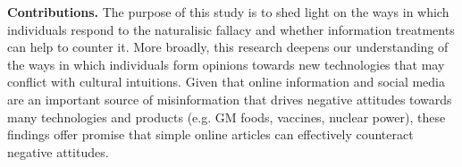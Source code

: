 \documentclass[12pt]{article}
\newcommand{\todo}[1]{\textit{\textcolor{red}{$<$todo$>$ #1 $<$/todo$>$}}}
\begin{document}






\textbf{Contributions.} The purpose of this study is to shed light on the ways in which individuals respond to the naturalisic fallacy and whether information treatments can help to counter it. More broadly, this research deepens our understanding of the ways in which individuals form opinions towards new technologies that may conflict with cultural intuitions. Given that online information and social media are an important source of misinformation that drives negative attitudes towards many technologies and products (e.g. GM foods, vaccines, nuclear power), these findings offer promise that simple online articles can effectively counteract negative attitudes.
\end{document}
